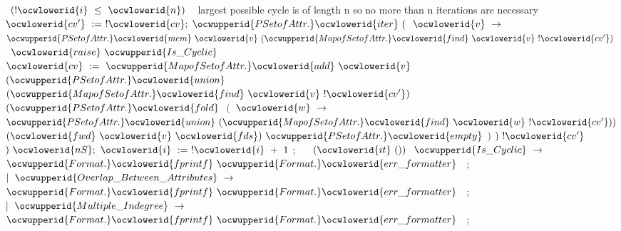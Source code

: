 \documentclass[12pt]{article}
\begin{document}
\ocwindent{2.00em}
~$(!\ocwlowerid{i}~\le{}~\ocwlowerid{n})~$~\ocwbc{} largest possible cycle is of length n so no more than n iterations are necessary \ocwec{}\ocweol
\ocwindent{3.00em}
$\ocwlowerid{cv'}~:=~!\ocwlowerid{cv};$\ocweol
\ocwindent{3.00em}
$\ocwupperid{PSetofAttr.}\ocwlowerid{iter}~($~$\ocwlowerid{v}~\rightarrow{}$\ocweol
\ocwindent{4.00em}
~$\ocwupperid{PSetofAttr.}\ocwlowerid{mem}~\ocwlowerid{v}~(\ocwupperid{MapofSetofAttr.}\ocwlowerid{find}~\ocwlowerid{v}~!\ocwlowerid{cv'})~$~$\ocwlowerid{raise}~\ocwupperid{Is\_Cyclic}$\ocweol
\ocwindent{4.00em}
~\ocweol
\ocwindent{5.00em}
$\ocwlowerid{cv}~:=~\ocwupperid{MapofSetofAttr.}\ocwlowerid{add}~\ocwlowerid{v}$\ocweol
\ocwindent{6.50em}
$(\ocwupperid{PSetofAttr.}\ocwlowerid{union}~$\ocweol
\ocwindent{8.00em}
$(\ocwupperid{MapofSetofAttr.}\ocwlowerid{find}~\ocwlowerid{v}~!\ocwlowerid{cv'})$\ocweol
\ocwindent{8.00em}
$(\ocwupperid{PSetofAttr.}\ocwlowerid{fold}~$\ocweol
\ocwindent{9.50em}
$($~$\ocwlowerid{w}~\rightarrow{}$\ocweol
\ocwindent{10.50em}
$\ocwupperid{PSetofAttr.}\ocwlowerid{union}~(\ocwupperid{MapofSetofAttr.}\ocwlowerid{find}~\ocwlowerid{w}~!\ocwlowerid{cv'}))$\ocweol
\ocwindent{9.50em}
$(\ocwlowerid{fwd}~\ocwlowerid{v}~\ocwlowerid{fds})~\ocwupperid{PSetofAttr.}\ocwlowerid{empty}$\ocweol
\ocwindent{8.00em}
$)$\ocweol
\ocwindent{6.50em}
$)~!\ocwlowerid{cv'}$\ocweol
\ocwindent{11.00em}
$)~\ocwlowerid{nS};$\ocweol
\ocwindent{3.00em}
$\ocwlowerid{i}~:=~!\ocwlowerid{i}~+~1$\ocweol
\ocwindent{2.00em}
;\ocweol
\ocwindent{2.00em}
~\ocweol
\ocwindent{2.00em}
~$(\ocwlowerid{it}~())~$\ocweol
\ocwindent{3.00em}
$\ocwupperid{Is\_Cyclic}~\rightarrow{}~$\ocweol
\ocwindent{4.00em}
$\ocwupperid{Format.}\ocwlowerid{fprintf}~\ocwupperid{Format.}\ocwlowerid{err\_formatter}~$~;\ocweol
\ocwindent{4.00em}
\ocweol
\ocwindent{2.00em}
$\mid{}~\ocwupperid{Overlap\_Between\_Attributes}~\rightarrow{}$\ocweol
\ocwindent{4.00em}
$\ocwupperid{Format.}\ocwlowerid{fprintf}~\ocwupperid{Format.}\ocwlowerid{err\_formatter}~$~;\ocweol
\ocwindent{4.00em}
\ocweol
\ocwindent{2.00em}
$\mid{}~\ocwupperid{Multiple\_Indegree}~\rightarrow{}$\ocweol
\ocwindent{4.00em}
$\ocwupperid{Format.}\ocwlowerid{fprintf}~\ocwupperid{Format.}\ocwlowerid{err\_formatter}~$~;\ocweol
\ocwindent{4.00em}
\medskip
\end{document}
